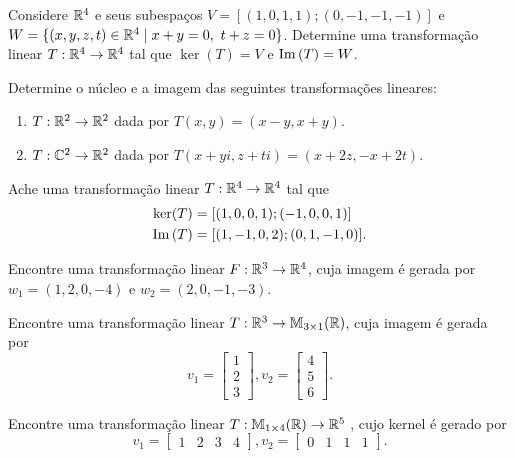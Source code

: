 \documentclass[12pt]{exam}
\begin{document}
\begin{exercicio}
  Considere $\mathbb{R}^4$ e seus subespaços $V = [(1,0,1,1);(0,-1,-1,-1)]$ e $W = \{(x,y,z,t) \in \mathbb{R}^4 \mid x + y = 0,\ t + z = 0\}$. Determine uma transformação linear $T : \mathbb{R}^4 \to \mathbb{R}^4$ tal que $\ker(T) = V$ e ${\rm Im\,}(T) = W$.
\end{exercicio}

\begin{exercicio}
  Determine o n\'ucleo e a imagem das seguintes transformações lineares:
  \begin{enumerate}[label={\alph*})]
    \item $T : \mathbb{R}^2 \to \mathbb{R}^2$ dada por $T(x,y) = (x - y, x + y)$.

    \item $T : \mathbb{C}^2 \to \mathbb{R}^2$ dada por $T(x + yi,z + ti) = (x + 2z, -x + 2t)$.
  \end{enumerate}
\end{exercicio}

\begin{exercicio}
  Ache uma transformação linear $T : \mathbb{R}^4 \to \mathbb{R}^4$ tal que
  \begin{align*}
    \ker(T) &= [(1,0,0,1);(-1,0,0,1)]\\
    {\rm Im\,}(T) &= [(1,-1,0,2);(0,1,-1,0)].
  \end{align*}
\end{exercicio}

\begin{exercicio}
  Encontre uma transformação linear $F : \mathbb{R}^3 \to \mathbb{R}^4$, cuja imagem é gerada por $w_1 = (1,2,0,-4)$ e $w_2 = (2,0,-1,-3)$.
\end{exercicio}

\begin{exercicio}
  Encontre uma transformação linear $T : \mathbb{R}^3 \to \mathbb{M}_{3 \times 1}(\mathbb{R})$, cuja imagem é gerada por
  \[
        v_1 = \begin{bmatrix}
                1\\2\\3
              \end{bmatrix},
        v_2 = \begin{bmatrix}
                 4\\5\\6
              \end{bmatrix}.
  \]
\end{exercicio}

\begin{exercicio}
  Encontre uma transformação linear $T : \mathbb{M}_{1 \times 4}(\mathbb{R}) \to \mathbb{R}^5$ , cujo kernel é gerado por
  \[
      v_1 = \begin{bmatrix}
                1 & 2 & 3 & 4
            \end{bmatrix},
      v_2 = \begin{bmatrix}
                0 & 1 & 1 & 1
            \end{bmatrix}.
  \]
\end{exercicio}
\end{document}
